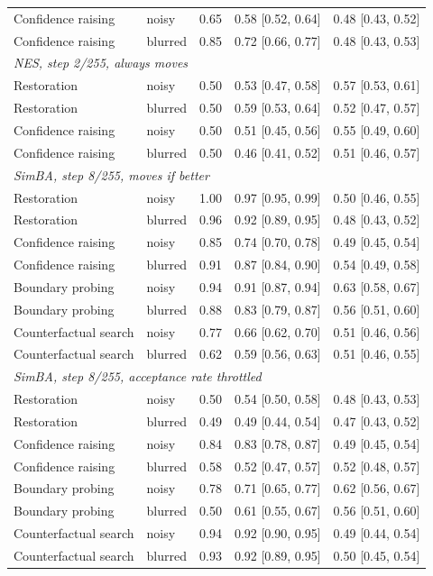 \begin{footnotesize}
\begin{longtable}{llccc}
Confidence raising & noisy & 0.65 & 0.58 {[}0.52, 0.64{]} & 0.48 {[}0.43, 0.52{]} \\
Confidence raising & blurred & 0.85 & 0.72 {[}0.66, 0.77{]} & 0.48 {[}0.43, 0.53{]} \\
\multicolumn{5}{l}{\emph{NES, step 2/255, always moves}} \\
Restoration & noisy & 0.50 & 0.53 {[}0.47, 0.58{]} & 0.57 {[}0.53, 0.61{]} \\
Restoration & blurred & 0.50 & 0.59 {[}0.53, 0.64{]} & 0.52 {[}0.47, 0.57{]} \\
Confidence raising & noisy & 0.50 & 0.51 {[}0.45, 0.56{]} & 0.55 {[}0.49, 0.60{]} \\
Confidence raising & blurred & 0.50 & 0.46 {[}0.41, 0.52{]} & 0.51 {[}0.46, 0.57{]} \\
\multicolumn{5}{l}{\emph{SimBA, step 8/255, moves if better}} \\
Restoration & noisy & 1.00 & 0.97 {[}0.95, 0.99{]} & 0.50 {[}0.46, 0.55{]} \\
Restoration & blurred & 0.96 & 0.92 {[}0.89, 0.95{]} & 0.48 {[}0.43, 0.52{]} \\
Confidence raising & noisy & 0.85 & 0.74 {[}0.70, 0.78{]} & 0.49 {[}0.45, 0.54{]} \\
Confidence raising & blurred & 0.91 & 0.87 {[}0.84, 0.90{]} & 0.54 {[}0.49, 0.58{]} \\
Boundary probing & noisy & 0.94 & 0.91 {[}0.87, 0.94{]} & 0.63 {[}0.58, 0.67{]} \\
Boundary probing & blurred & 0.88 & 0.83 {[}0.79, 0.87{]} & 0.56 {[}0.51, 0.60{]} \\
Counterfactual search & noisy & 0.77 & 0.66 {[}0.62, 0.70{]} & 0.51 {[}0.46, 0.56{]} \\
Counterfactual search & blurred & 0.62 & 0.59 {[}0.56, 0.63{]} & 0.51 {[}0.46, 0.55{]} \\
\multicolumn{5}{l}{\emph{SimBA, step 8/255, acceptance rate throttled}} \\
Restoration & noisy & 0.50 & 0.54 {[}0.50, 0.58{]} & 0.48 {[}0.43, 0.53{]} \\
Restoration & blurred & 0.49 & 0.49 {[}0.44, 0.54{]} & 0.47 {[}0.43, 0.52{]} \\
Confidence raising & noisy & 0.84 & 0.83 {[}0.78, 0.87{]} & 0.49 {[}0.45, 0.54{]} \\
Confidence raising & blurred & 0.58 & 0.52 {[}0.47, 0.57{]} & 0.52 {[}0.48, 0.57{]} \\
Boundary probing & noisy & 0.78 & 0.71 {[}0.65, 0.77{]} & 0.62 {[}0.56, 0.67{]} \\
Boundary probing & blurred & 0.50 & 0.61 {[}0.55, 0.67{]} & 0.56 {[}0.51, 0.60{]} \\
Counterfactual search & noisy & 0.94 & 0.92 {[}0.90, 0.95{]} & 0.49 {[}0.44, 0.54{]} \\
Counterfactual search & blurred & 0.93 & 0.92 {[}0.89, 0.95{]} & 0.50 {[}0.45, 0.54{]} \\
\bottomrule
\end{longtable}
\end{footnotesize}
